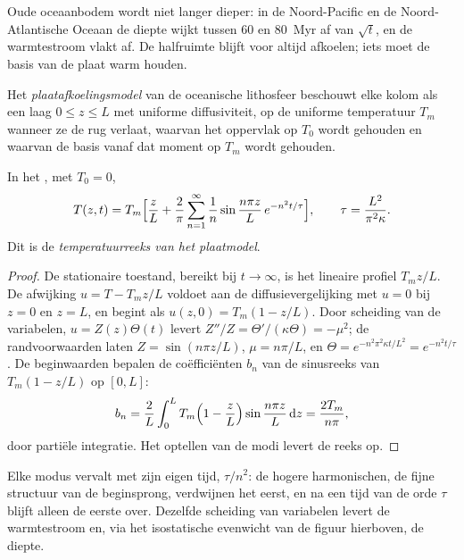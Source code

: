 Oude oceaanbodem wordt niet langer dieper: in de Noord-Pacific en de Noord-Atlantische Oceaan
de diepte wijkt tussen 60 en \qty{80}{Myr} af van $\sqrt t$, en de warmtestroom vlakt af.
De halfruimte blijft voor altijd afkoelen; iets moet de basis van de
plaat warm houden.

\begin{definition}[Plaatafkoelingsmodel]\label{def:b3:lithosphere-thermal-models:plate}
Het \emph{plaatafkoelingsmodel} van de oceanische
lithosfeer beschouwt elke kolom als een laag $0 \le z \le L$ met uniforme
diffusiviteit, op de uniforme temperatuur $T_m$ wanneer ze de rug verlaat, waarvan
het oppervlak op $T_0$ wordt gehouden en waarvan de basis vanaf dat moment op $T_m$ wordt gehouden.
\end{definition}

\begin{theorem}\label{thm:b3:lithosphere-thermal-models:plate-series}
In het , met $T_0 = 0$,
\[
  T(z, t) = T_m\Bigl[\frac zL + \frac2\pi\sum_{n=1}^\infty\frac1n
  \sin\frac{n\pi z}{L}\,e^{-n^2t/\tau}\Bigr],\qquad
  \tau = \frac{L^2}{\pi^2\kappa} .
\]
Dit is de \emph{temperatuurreeks van het plaatmodel}.
\end{theorem}

\begin{proof}
De stationaire toestand, bereikt bij $t \to \infty$, is het lineaire profiel $T_mz/L$.
De afwijking $u = T - T_mz/L$ voldoet aan de diffusievergelijking met $u = 0$ bij
$z = 0$ en $z = L$, en begint als $u(z, 0) = T_m(1 - z/L)$. Door scheiding van de
variabelen, $u = Z(z)\Theta(t)$ levert $Z''/Z = \Theta'/(\kappa\Theta) = -\mu^2$;
de randvoorwaarden laten $Z = \sin(n\pi z/L)$, $\mu = n\pi/L$, en
$\Theta = e^{-n^2\pi^2\kappa t/L^2} = e^{-n^2t/\tau}$. De beginwaarden bepalen de
coëfficiënten $b_n$ van de sinusreeks van $T_m(1 - z/L)$ op $[0, L]$:
\[
  b_n = \frac2L\int_0^LT_m\Bigl(1 - \frac zL\Bigr)\sin\frac{n\pi z}{L}\,\mathrm dz
  = \frac{2T_m}{n\pi},
\]
door partiële integratie. Het optellen van de modi levert de reeks op.
\end{proof}

Elke modus vervalt met zijn eigen tijd, $\tau/n^2$: de hogere harmonischen, de fijne
structuur van de beginsprong, verdwijnen het eerst, en na een tijd van de orde $\tau$
blijft alleen de eerste over. Dezelfde scheiding van variabelen levert de
warmtestroom en, via het isostatische evenwicht van de figuur hierboven, de diepte.

